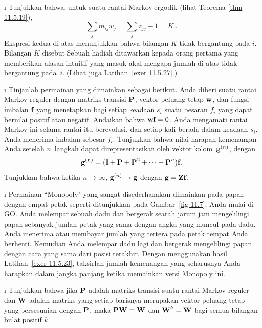 \begin{LJSItem}
\i\label{exer 11.5.22} Tunjukkan bahwa, untuk suatu rantai Markov ergodik (lihat
Teorema \ref{thm 11.5.19}),
$$
\sum_j m_{ij} w_j = \sum_j z_{jj} - 1 = K\ .
$$
Ekspresi kedua di atas menunjukkan bahwa bilangan $K$ tidak bergantung pada $i$.
Bilangan $K$ disebut  Sebuah
hadiah ditawarkan kepada orang pertama yang memberikan alasan intuitif yang
masuk akal mengapa jumlah di atas tidak bergantung pada~$i$. (Lihat juga
Latihan~\ref{exer 11.5.27}.)

\i\label{exer 11.5.23} Tinjaulah permainan yang dimainkan sebagai berikut. Anda
diberi suatu rantai Markov reguler dengan matriks transisi ${\mbox{\bf P}\/}$, vektor
peluang tetap ${\mbox{\bf w}\/}$, dan fungsi imbalan ${\mbox{\bf f}\/}$ yang menetapkan bagi setiap
keadaan $s_i$ suatu besaran $f_i$ yang dapat bernilai positif atau negatif.
Andaikan bahwa ${\mbox{\bf w}\/}{\mbox{\bf f}\/} = 0$. Anda mengamati rantai Markov ini
selama rantai itu berevolusi, dan setiap kali berada dalam keadaan $s_i$, Anda menerima
imbalan sebesar $f_i$. Tunjukkan bahwa nilai harapan kemenangan Anda setelah
$n$~langkah dapat direpresentasikan oleh vektor kolom~${\mbox{\bf g}\/}^{(n)}$, dengan
$${\mbox{\bf g}\/}^{(n)} = ({\mbox{\bf I}\/} + {\mbox{\bf P}\/} + {\mbox{\bf P}\/}^2 +\cdots+ {\mbox{\bf P}\/}^n)
{\mbox{\bf f}\/}.$$ Tunjukkan bahwa ketika $n \to
\infty$, ${\mbox{\bf g}\/}^{(n)} \to {\mbox{\bf g}\/}$ dengan ${\mbox{\bf g}\/} = {\mbox{\bf Z}\/} {\mbox{\bf f}\/}$.
 
\i\label{exer 11.5.24} Permainan ``Monopoly" yang sangat disederhanakan dimainkan
pada papan dengan empat petak seperti ditunjukkan pada
Gambar~\ref{fig 11.7}. Anda mulai di GO. Anda melempar sebuah
dadu dan bergerak searah jarum jam mengelilingi papan sebanyak jumlah petak yang
sama dengan angka yang muncul pada dadu. Anda menerima atau membayar jumlah yang
tertera pada petak tempat Anda berhenti. Kemudian Anda melempar dadu lagi dan
bergerak mengelilingi papan dengan cara yang sama dari posisi terakhir. Dengan
menggunakan hasil Latihan~\ref{exer 11.5.23}, taksirlah jumlah kemenangan yang
seharusnya Anda harapkan dalam jangka panjang ketika memainkan versi Monopoly
ini.

  
\i\label{exer 11.5.28} Tunjukkan bahwa jika ${\mbox{\bf P}\/}$ adalah matriks transisi suatu
rantai Markov reguler dan ${\mbox{\bf W}\/}$ adalah matriks yang setiap barisnya merupakan
vektor peluang tetap yang bersesuaian dengan ${\mbox{\bf P}\/}$, maka
${\mbox{\bf P}\/}{\mbox{\bf W}\/} = {\mbox{\bf W}\/}$ dan ${\mbox{\bf W}\/}^k = {\mbox{\bf W}\/}$ bagi semua bilangan
bulat positif $k$.


\end{LJSItem}
